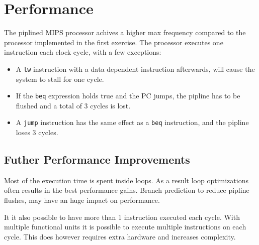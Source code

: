 \section{Performance}
The piplined MIPS processor achives a higher max frequency compared to the processor implemented in the first exercise.
The processor executes one instruction each clock cycle, with a few exceptions:

\begin{itemize}
\item A \texttt{lw} instruction with a data dependent instruction afterwards, will cause the system to stall for one cycle.
\item If the \texttt{beq} expression holds true and the PC jumps, the pipline has to be flushed and a total of 3 cycles is lost.
\item A \texttt{jump} instruction has the same effect as a \texttt{beq} instruction, and the pipline loses 3 cycles.
\end{itemize}

\subsection{Futher Performance Improvements}
Most of the execution time is spent inside loops.
As a result loop optimizations often results in the best performance gains.
Branch prediction to reduce pipline flushes, may have an huge impact on performance.


It it also possible to have more than 1 instruction executed each cycle.
With multiple functional units it is possible to execute multiple instructions on each cycle.
This does however requires extra hardware and increases complexity.
